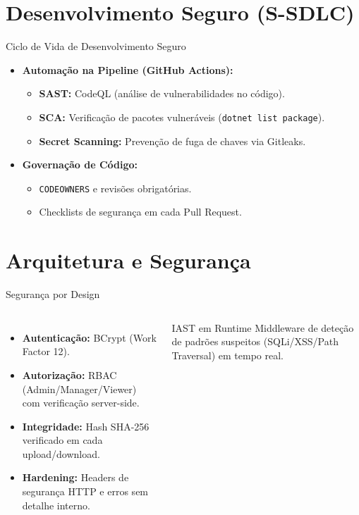 \documentclass[aspectratio=169]{beamer}
\begin{document}
\section{Desenvolvimento Seguro (S-SDLC)}
\begin{frame}{Ciclo de Vida de Desenvolvimento Seguro}
    \begin{itemize}
        \item \textbf{Automação na Pipeline (GitHub Actions):}
        \begin{itemize}
            \item \textbf{SAST:} CodeQL (análise de vulnerabilidades no código).
            \item \textbf{SCA:} Verificação de pacotes vulneráveis (\texttt{dotnet list package}).
            \item \textbf{Secret Scanning:} Prevenção de fuga de chaves via Gitleaks.
        \end{itemize}
        \item \textbf{Governação de Código:}
        \begin{itemize}
            \item \texttt{CODEOWNERS} e revisões obrigatórias.
            \item Checklists de segurança em cada Pull Request.
        \end{itemize}
    \end{itemize}
\end{frame}

\section{Arquitetura e Segurança}
\begin{frame}{Segurança por Design}
    \begin{columns}
        \begin{itemize}
            \item \textbf{Autenticação:} BCrypt (Work Factor 12).
            \item \textbf{Autorização:} RBAC (Admin/Manager/Viewer) com verificação server-side.
            \item \textbf{Integridade:} Hash SHA-256 verificado em cada upload/download.
            \item \textbf{Hardening:} Headers de segurança HTTP e erros sem detalhe interno.
        \end{itemize}
        
        \begin{alertblock}{IAST em Runtime}
            Middleware de deteção de padrões suspeitos (SQLi/XSS/Path Traversal) em tempo real.
        \end{alertblock}
    \end{columns}
\end{frame}
\end{document}
